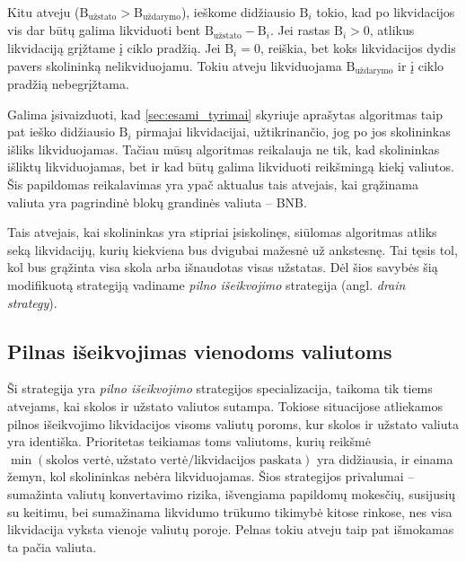 \documentclass[]{VUMIFTemplateClass}
\begin{document}
Kitu atveju ($\text{B}_{\text{užstato}} > \text{B}_{\text{uždarymo}}$), ieškome didžiausio $\text{B}_{i}$ tokio, kad po likvidacijos vis dar būtų galima likviduoti bent $\text{B}_{\text{užstato}} - \text{B}_{i}$. Jei rastas $\text{B}_{i} > 0$, atlikus likvidaciją grįžtame į ciklo pradžią. Jei $\text{B}_{i} = 0$, reiškia, bet koks likvidacijos dydis pavers skolininką nelikviduojamu. Tokiu atveju likviduojama $\text{B}_{\text{uždarymo}}$ ir į ciklo pradžią nebegrįžtama.

Galima įsivaizduoti, kad \ref{sec:esami_tyrimai} skyriuje aprašytas algoritmas taip pat ieško didžiausio $\text{B}_{i}$ pirmajai likvidacijai, užtikrinančio, jog po jos skolininkas išliks likviduojamas. Tačiau mūsų algoritmas reikalauja ne tik, kad skolininkas išliktų likviduojamas, bet ir kad būtų galima likviduoti reikšmingą kiekį valiutos. Šis papildomas reikalavimas yra ypač aktualus tais atvejais, kai grąžinama valiuta yra pagrindinė blokų grandinės valiuta – BNB.

Tais atvejais, kai skolininkas yra stipriai įsiskolinęs, siūlomas algoritmas atliks seką likvidacijų, kurių kiekviena bus dvigubai mažesnė už ankstesnę. Tai tęsis tol, kol bus grąžinta visa skola arba išnaudotas visas užstatas. Dėl šios savybės šią modifikuotą strategiją vadiname \textit{pilno išeikvojimo} strategija (angl. \textit{drain strategy}).

\subsection{Pilnas išeikvojimas vienodoms valiutoms}
\label{sec:pilnas_iseikvojimas_vienodoms_valiutoms}

Ši strategija yra \textit{pilno išeikvojimo} strategijos specializacija, taikoma tik tiems atvejams, kai skolos ir užstato valiutos sutampa. Tokiose situacijose atliekamos pilnos išeikvojimo likvidacijos visoms valiutų poroms, kur skolos ir užstato valiuta yra identiška. Prioritetas teikiamas toms valiutoms, kurių reikšmė $\min(\text{skolos vertė}, \text{užstato vertė} / \text{likvidacijos paskata})$ yra didžiausia, ir einama žemyn, kol skolininkas nebėra likviduojamas. Šios strategijos privalumai – sumažinta valiutų konvertavimo rizika, išvengiama papildomų mokesčių, susijusių su keitimu, bei sumažinama likvidumo trūkumo tikimybė kitose rinkose, nes visa likvidacija vyksta vienoje valiutų poroje. Pelnas tokiu atveju taip pat išmokamas ta pačia valiuta.
\end{document}
